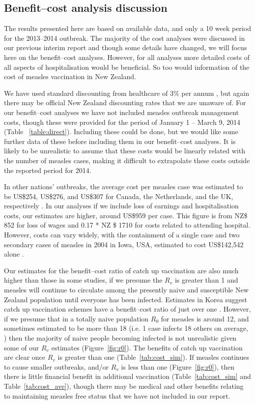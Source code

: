 \documentclass{article}
\begin{document}
\subsection{Benefit--cost analysis discussion}
The results presented here are based on available data, and only a 10 week period for the 2013--2014 outbreak. The majority of the cost analyses were discussed in our previous interim report and though some details have changed, we will focus here on the benefit--cost analyses. However, for all analyses more detailed costs of all aspects of hospitalisation would be beneficial. So too would information of the cost of measles vaccination in New Zealand.

We have used standard discounting from healthcare of 3\% per annum \citep{honeycutt6}, but again there may be official New Zealand discounting rates that we are unaware of.
For our benefit--cost analyses we have not included measles outbreak management costs, though these were provided for the period of January 1 -- March 9, 2014 (Table ~\ref{table:direct}). Including these could be done, but we would like some further data of these before including them in our benefit--cost analyses. It is likely to be unrealistic to assume that these costs would be linearly related with the number of measles cases, making it difficult to extrapolate these costs outside the reported period for 2014.

In other nations' outbreaks, the average cost per measles case was estimated to be US\$254, US\$276, and US\$307 for Canada, the Netherlands, and the UK, respectively \citep{carabin2}. In our analyses if we include loss of earnings and hospitalisation costs, our estimates are higher, around US\$959 per case. This figure is from NZ\$ 852 for loss of wages and 0.17 * NZ \$ 1710 for costs related to attending hospital. However, costs can vary widely, with the containment of a single case and two secondary cases of measles in 2004 in Iowa, USA, estimated to cost US\$142,542 alone \citep{dayan5}.

Our estimates for the benefit--cost ratio of catch up vaccination are also much higher than those in some studies, if we presume the $R_v$ is greater than 1 and measles will continue to circulate among the presently naive and susceptible New Zealand population until everyone has been infected. Estimates in Korea suggest catch up vaccination schemes have a benefit--cost ratio of just over one \citep{bae13}. However, if we presume that in a totally naive population $R_0$ for measles is around 12, and sometimes estimated to be more than 18 (i.e. 1 case infects 18 others on average, \citep{anderson91}) then the majority of naive people becoming infected is not unrealistic given some of our $R_v$ estimates (Figure~\ref{fig:r0}). The benefits of catch up vaccination are clear once $R_v$ is greater than one (Table~\ref{tab:cost_sim}). If measles continues to cause smaller outbreaks, and/or $R_v$ is less than one (Figure~\ref{fig:r0}), then there is little financial benefit in additional vaccination (Table~\ref{tab:cost_sim} and Table~\ref{tab:cost_ave}), though there may be medical and other benefits relating to maintaining measles free status that we have not included in our report.
\end{document}
